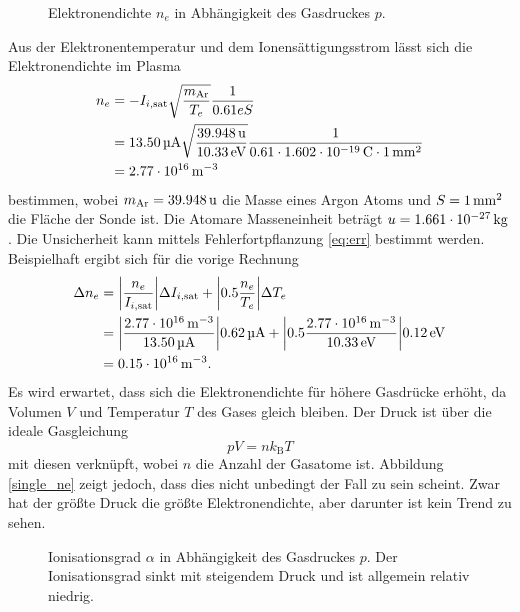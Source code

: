 \begin{figure}[htbp]
    \centering
    
    \caption{
        Elektronendichte $n_e$ in Abh\"angigkeit des Gasdruckes $p$.
    }
    \label{single_ne}
\end{figure}
Aus der Elektronentemperatur und dem Ionens\"attigungsstrom l\"asst sich die Elektronendichte im Plasma
\begin{align}
n_e
    &=-I_{i,\text{sat}}\sqrt{\frac{m_\text{Ar}}{T_e}}\frac{1}{0.61eS}\label{sne}\\
    &=\siAIisata\sqrt{\frac{\simAr}{\siATea}}\frac{1}{0.61\cdot \sie \cdot\siS}\nonumber\\
    &=\siAnea\nonumber
\end{align}
bestimmen, wobei $m_\text{Ar}=\simAr$ die Masse eines Argon Atoms und $S=\SI{1}{\milli\metre\squared}$ die Fl\"ache der Sonde ist.
Die Atomare Masseneinheit betr\"agt $u=\SI{1.661e-27}{\kilo\gram}$.
Die Unsicherheit kann mittels Fehlerfortpflanzung \eqref{eq:err} bestimmt werden.
Beispielhaft ergibt sich f\"ur die vorige Rechnung
\begin{align}
\Delta n_e
    &=\abs{\frac{n_e}{I_{i,\text{sat}}}}\Delta I_{i,\text{sat}}+\abs{0.5\frac{n_e}{T_e}}\Delta T_e\\
    &=\abs{\frac{\siAnea}{\siAIisata}}\sierrAIisata+\abs{0.5\frac{\siAnea}{\siATea}}\sierrATea\nonumber\\
    &=\sierrAnea .\nonumber
\end{align}
Es wird erwartet, dass sich die Elektronendichte f\"ur h\"ohere Gasdr\"ucke erh\"oht, da Volumen $V$ und Temperatur $T$ des Gases gleich bleiben.
Der Druck ist \"uber die ideale Gasgleichung
\begin{equation}
pV = nk_\text{B}T\label{idgas}
\end{equation}
mit diesen verkn\"upft, wobei $n$ die Anzahl der Gasatome ist.
Abbildung \vref{single_ne} zeigt jedoch, dass dies nicht unbedingt der Fall zu sein scheint.
Zwar hat der gr\"o\ss te Druck die gr\"o\ss te Elektronendichte, aber darunter ist kein Trend zu sehen.

\begin{figure}[htbp]
    \centering
    
    \caption{
        Ionisationsgrad $\alpha$ in Abh\"angigkeit des Gasdruckes $p$.
        Der Ionisationsgrad sinkt mit steigendem Druck und ist allgemein relativ niedrig.
    }
    \label{single_alpha}
\end{figure}

